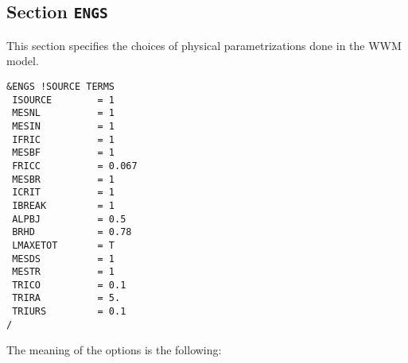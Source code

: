 \documentclass[12pt]{amsart}
\begin{document}
\subsection{Section {\tt ENGS}}
This section specifies the choices of physical parametrizations done in the WWM model.
\begin{verbatim}
&ENGS !SOURCE TERMS
 ISOURCE        = 1
 MESNL          = 1      
 MESIN          = 1      
 IFRIC          = 1              
 MESBF          = 1              
 FRICC          = 0.067          
 MESBR          = 1              
 ICRIT          = 1              
 IBREAK         = 1
 ALPBJ          = 0.5            
 BRHD           = 0.78           
 LMAXETOT       = T              
 MESDS          = 1              
 MESTR          = 1          
 TRICO          = 0.1        
 TRIRA          = 5.       
 TRIURS         = 0.1      
/
\end{verbatim}
The meaning of the options is the following:
\end{document}
